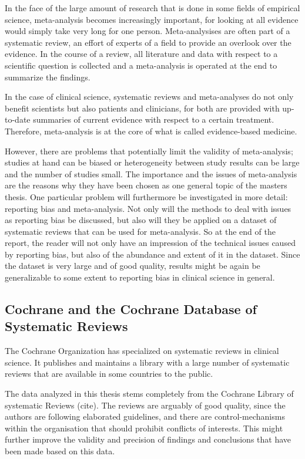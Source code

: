 \documentclass[11pt,a4paper,twoside]{book}\usepackage[]{graphicx}\usepackage[]{color}
\begin{document}
\vspace{0mm}
In the face of the large amount of research that is done in some fields of empirical science, meta-analysis becomes increasingly important, for looking at all evidence would simply take very long for one person. Meta-analysises are often part of a systematic review, an effort of experts of a field to provide an overlook over the evidence. In the course of a review, all literature and data with respect to a scientific question is collected and a meta-analysis is operated at the end to summarize the findings.

\vspace{0mm}
In the case of clinical science, systematic reviews and meta-analyses do not only benefit scientists but also patients and clinicians, for both are provided with up-to-date summaries of current evidence with respect to a certain treatment. Therefore, meta-analysis is at the core of what is called evidence-based medicine. 

\vspace{0mm}
However, there are problems that potentially limit the validity of meta-analysis; studies at hand can be biased or heterogeneity between study results can be large and the number of studies small. The importance and the issues of meta-analysis are the reasons why they have been chosen as one general topic of the masters thesis. One particular problem will furthermore be investigated in more detail: reporting bias and meta-analysis. Not only will the methods to deal with issues as reporting bias be discussed, but also will they be applied on a dataset of systematic reviews that can be used for meta-analysis. So at the end of the report, the reader will not only have an impression of the technical issues caused by reporting bias, but also of the abundance and extent of it in the dataset. Since the dataset is very large and of good quality, results might be again be generalizable to some extent to reporting bias in clinical science in general.


\subsection{Cochrane and the Cochrane Database of Systematic Reviews}
The Cochrane Organization has specialized on systematic reviews in clinical science. It publishes and maintains a library with a large number of systematic reviews that are available in some countries to the public.

\vspace{0mm}
The data analyzed in this thesis stems completely from the Cochrane Library of systematic Reviews (cite). The reviews are arguably of good quality, since the authors are following elaborated guidelines, and there are control-mechanisms within the organisation that should prohibit conflicts of interests. This might further improve the validity and precision of findings and conclusions that have been made based on this data. 
\end{document}

